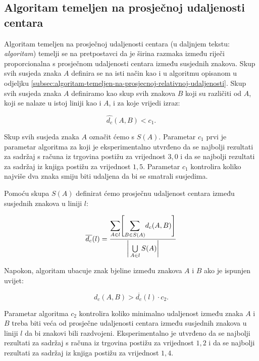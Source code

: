 \documentclass[times, utf8, zavrsni]{fer}
\begin{document}
\subsection{Algoritam temeljen na prosječnoj udaljenosti centara}
\label{subsec:algoritam-temeljen-na-prosjecnoj-udaljenosti-centara}
Algoritam temeljen na prosječnoj udaljenosti centara (u daljnjem tekstu:
\emph{algoritam}) temelji se na pretpostavci da je širina razmaka između riječi
proporcionalna s prosječnom udaljenosti centara između susjednih znakova.
Skup svih susjeda znaka $A$ definira se na isti način kao i u algoritmu
opisanom u odjeljku
\ref{subsec:algoritam-temeljen-na-prosjecnoj-relativnoj-udaljenosti}. Skup svih
susjeda znaka $A$ definiramo kao skup svih znakova $B$ koji su različiti od $A$,
koji se nalaze u istoj liniji kao i $A$, i za koje vrijedi izraz:

\begin{equation}
\hat{d_c}(A, B) < c_1 \texttt{.}
\end{equation}

Skup svih susjeda znaka $A$ označit ćemo s $S(A)$. Parametar $c_1$ prvi je
parametar algoritma za koji je eksperimentalno utvrđeno
da se najbolji rezultati za sadržaj s računa iz trgovina postižu za vrijednost
$3{,}0$ i da se najbolji rezultati za sadržaj iz knjiga postižu za vrijednost
$1{,}5$. Parametar $c_1$ kontrolira koliko najviše dva znaka smiju biti udaljena
da bi se smatrali susjedima.

\pagebreak

Pomoću skupa $S(A)$ definirat ćemo prosječnu udaljenost centara između
susjednih znakova u liniji $l$:

\begin{equation}
\overline{d_c}(l) =
\frac{
    \mathlarger{\sum}\limits_{A \in l}
    \Bigg[
    \mathlarger{\sum}\limits_{B \in S(A)} d_c(A, B)
    \Bigg]
}
{\bigg|\bigcup\limits_{A \in l} S(A)\bigg|}
\end{equation}

Napokon, algoritam ubacuje znak bjeline između znakova $A$ i $B$ ako je ispunjen
uvijet:

\begin{equation}
d_c(A, B) > \overline{d_c}(l) \cdot c_2 \texttt{.}
\end{equation}

Parametar algoritma $c_2$ kontrolira koliko minimalno udaljenost između znaka
$A$ i $B$ treba biti veća od prosječne udaljenosti centara između susjednih
znakova u liniji $l$ da bi znakovi bili razdvojeni. Eksperimentalno je utvrđeno
da se najbolji rezultati za sadržaj s računa iz trgovina postižu za vrijednost
$1{,}2$ i da se najbolji rezultati za sadržaj iz knjiga postižu za vrijednost
$1{,}4$.
\end{document}
